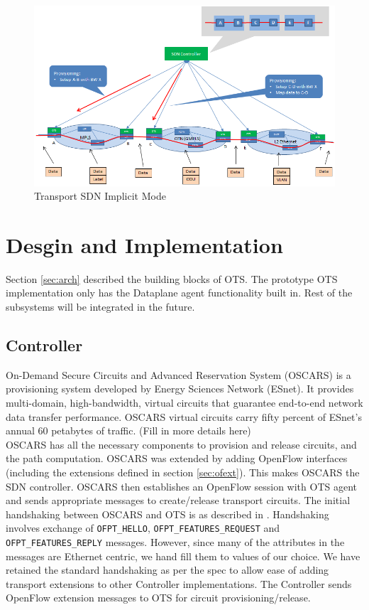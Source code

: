 \documentclass{sig-alternate-10pt}
\begin{document}
	\begin{figure}[htb]
	\centering
	\includegraphics[scale=0.37]{OTSImplicit.png}
	\caption{Transport SDN Implicit Mode}
	\label{fig:OTSImplicit}
	\end{figure}

\section{Desgin and Implementation}
\label{sec:design}
	Section \ref{sec:arch} described the building blocks of OTS. The prototype OTS implementation only has the 
	Dataplane agent functionality built in. Rest of the subsystems will be integrated in the future. 

	\subsection{Controller}
	\label{sec:oscars}
	On-Demand Secure Circuits and Advanced Reservation System (OSCARS) \cite{oscars} is a provisioning system
	developed by Energy Sciences Network (ESnet). It provides multi-domain, high-bandwidth, virtual circuits
	that guarantee end-to-end network data transfer performance. OSCARS virtual circuits carry fifty percent
	of ESnet's annual 60 petabytes of traffic. (Fill in more details here) \\
	
	OSCARS has all the necessary components to provision and release circuits, and the path computation.
	OSCARS was extended by adding OpenFlow interfaces (including the extensions defined in section
	\ref{sec:ofext}). This makes OSCARS the SDN controller. OSCARS then establishes an OpenFlow session with
	OTS agent and sends appropriate messages to create/release transport circuits. The initial handshaking
	between OSCARS and OTS is as described in \cite{OF1.0}. Handshaking involves exchange of
	\texttt{OFPT\_HELLO}, \texttt{OFPT\_FEATURES\_REQUEST} and \texttt{OFPT\_FEATURES\_REPLY} messages.
	However, since many of the attributes in the messages are Ethernet centric, we hand fill them to values
	of our choice. We have retained the standard handshaking as per the spec to allow ease of adding
	transport extensions to other Controller implementations. The Controller sends OpenFlow extension
	messages to OTS for circuit provisioning/release.
	
\end{document}
